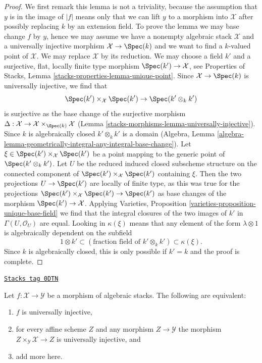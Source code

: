 \begin{proof}
We first remark this lemma is not a triviality, because the assumption that
$y$ is in the image of $|f|$ means only that we can lift
$y$ to a morphism into $\mathcal{X}$ after possibly replacing
$k$ by an extension field. To prove the lemma we may base change
$f$ by $y$, hence we may assume we have a nonempty algebraic stack
$\mathcal{X}$ and a universally injective morphism
$\mathcal{X} \to \Spec(k)$ and we want to find a $k$-valued point
of $\mathcal{X}$. We may replace $\mathcal{X}$ by its reduction.
We may choose a field $k'$ and a surjective, flat, locally finite type morphism
$\Spec(k') \to \mathcal{X}$, see
Properties of Stacks, Lemma \ref{stacks-properties-lemma-unique-point}.
Since $\mathcal{X} \to \Spec(k)$ is universally injective, we find that
$$
\Spec(k') \times_\mathcal{X} \Spec(k') \to \Spec(k' \otimes_k k')
$$
is surjective as the base change of the surjective morphism
$\Delta : \mathcal{X} \to \mathcal{X} \times_{\Spec(k)} \mathcal{X}$
(Lemma \ref{stacks-morphisms-lemma-universally-injective}).
Since $k$ is algebraically closed $k' \otimes_k k'$ is a domain
(Algebra, Lemma
\ref{algebra-lemma-geometrically-integral-any-integral-base-change}).
Let $\xi \in \Spec(k') \times_\mathcal{X} \Spec(k')$
be a point mapping to the generic point of $\Spec(k' \otimes_k k')$.
Let $U$ be the reduced induced closed subscheme structure on
the connected component of $\Spec(k') \times_\mathcal{X} \Spec(k')$
containing $\xi$. Then the two projections $U \to \Spec(k')$
are locally of finite type, as this was true for the projections
$\Spec(k') \times_\mathcal{X} \Spec(k') \to \Spec(k')$
as base changes of the morphism $\Spec(k') \to \mathcal{X}$.
Applying
Varieties, Proposition \ref{varieties-proposition-unique-base-field}
we find that the integral closures of the two images
of $k'$ in $\Gamma(U, \mathcal{O}_U)$ are equal.
Looking in $\kappa(\xi)$ means that any element of the form
$\lambda \otimes 1$ is algebraically dependent on
the subfield
$$
1 \otimes k' \subset
(\text{fraction field of }k' \otimes_k k') \subset
\kappa(\xi).
$$
Since $k$ is algebraically closed, this is only possible
if $k' = k$ and the proof is complete.
\end{proof}

\begin{lemma}
\label{stacks-morphisms-lemma-universally-injective-local}
\href{https://stacks.math.columbia.edu/tag/0DTN}{\texttt{Stacks tag 0DTN}}

Let $f : \mathcal{X} \to \mathcal{Y}$ be a morphism of algebraic stacks.
The following are equivalent:
\begin{enumerate}
\item $f$ is universally injective,
\item for every affine scheme $Z$ and any morphism
$Z \to \mathcal{Y}$ the morphism $Z \times_\mathcal{Y} \mathcal{X} \to Z$
is universally injective, and
\item add more here.
\end{enumerate}
\end{lemma}

